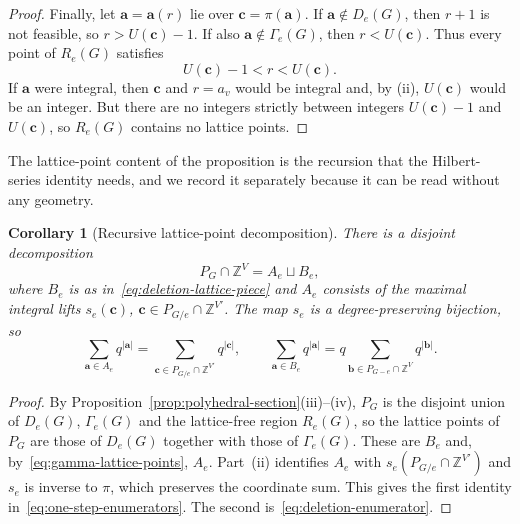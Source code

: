 \documentclass[11pt]{article}
\theoremstyle{plain}
\newtheorem{corollary}[theorem]{Corollary}
\theoremstyle{definition}
\newcommand{\ba}{\mathbf{a}}
\newcommand{\bb}{\mathbf{b}}
\newcommand{\bc}{\mathbf{c}}
\newcommand{\ZZ}{\mathbb Z}
\numberwithin{equation}{section}
\begin{document}
\begin{proof}
Finally, let $\ba=\ba(r)$ lie over $\bc=\pi(\ba)$.  If $\ba\notin D_e(G)$, then
$r+1$ is not feasible, so $r>U(\bc)-1$.  If also $\ba\notin\Gamma_e(G)$, then
$r<U(\bc)$.  Thus every point of $R_e(G)$ satisfies
\begin{equation}
   U(\bc)-1<r<U(\bc).
\label{eq:lattice-free-strip}
\end{equation}
If $\ba$ were integral, then $\bc$ and $r=a_v$ would be integral and, by (ii),
$U(\bc)$ would be an integer.  But there are no integers strictly between
integers $U(\bc)-1$ and $U(\bc)$, so $R_e(G)$ contains no lattice points.
\end{proof}

The lattice-point content of the proposition is the recursion that the
Hilbert-series identity needs, and we record it separately because it can be
read without any geometry.

\begin{corollary}[Recursive lattice-point decomposition]
\label{lem:recursive-cell-decomposition}
There is a disjoint decomposition
\[
   P_G\cap\ZZ^V=A_e\sqcup B_e,
\]
where $B_e$ is as in~\eqref{eq:deletion-lattice-piece} and $A_e$ consists of
the maximal integral lifts $s_e(\bc)$, $\bc\in P_{G/e}\cap\ZZ^{V'}$.
The map $s_e$ is a degree-preserving bijection, so
\begin{equation}
   \sum_{\ba\in A_e}q^{|\ba|}
      =\sum_{\bc\in P_{G/e}\cap\ZZ^{V'}}q^{|\bc|},
   \qquad
   \sum_{\ba\in B_e}q^{|\ba|}
      =q\sum_{\bb\in P_{G-e}\cap\ZZ^V}q^{|\bb|}.
\label{eq:one-step-enumerators}
\end{equation}
\end{corollary}

\begin{proof}
By Proposition~\ref{prop:polyhedral-section}(iii)--(iv), $P_G$ is the disjoint
union of $D_e(G)$, $\Gamma_e(G)$ and the lattice-free region $R_e(G)$, so the
lattice points of $P_G$ are those of $D_e(G)$ together with those of
$\Gamma_e(G)$. These are $B_e$ and, by~\eqref{eq:gamma-lattice-points}, $A_e$.
Part~(ii) identifies $A_e$ with $s_e(P_{G/e}\cap\ZZ^{V'})$ and $s_e$ is
inverse to $\pi$, which preserves the coordinate sum.  This gives the first
identity in~\eqref{eq:one-step-enumerators}.  The second
is~\eqref{eq:deletion-enumerator}.
\end{proof}
\end{document}
